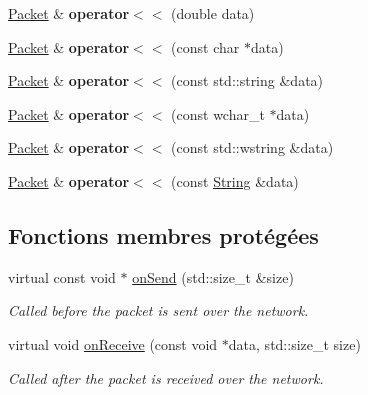 \begin{DoxyCompactItemize}
\hyperlink{classsf_1_1Packet}{Packet} \& {\bfseries operator$<$$<$} (double data)
\item 
\mbox{\label{classsf_1_1Packet_a67c9985f7b3d6e90886e56e309280a9d}} 
\hyperlink{classsf_1_1Packet}{Packet} \& {\bfseries operator$<$$<$} (const char $\ast$data)
\item 
\mbox{\label{classsf_1_1Packet_a59a21671caaa69da5d47c54b50e1eb54}} 
\hyperlink{classsf_1_1Packet}{Packet} \& {\bfseries operator$<$$<$} (const std\+::string \&data)
\item 
\mbox{\label{classsf_1_1Packet_a6f7c6a9ce795fac342ea937896d98016}} 
\hyperlink{classsf_1_1Packet}{Packet} \& {\bfseries operator$<$$<$} (const wchar\+\_\+t $\ast$data)
\item 
\mbox{\label{classsf_1_1Packet_a9f3401d038470f629d0c2c6be928a14b}} 
\hyperlink{classsf_1_1Packet}{Packet} \& {\bfseries operator$<$$<$} (const std\+::wstring \&data)
\item 
\mbox{\label{classsf_1_1Packet_abc17272df082a36b202e10045bd9e220}} 
\hyperlink{classsf_1_1Packet}{Packet} \& {\bfseries operator$<$$<$} (const \hyperlink{classsf_1_1String}{String} \&data)
\end{DoxyCompactItemize}
\subsection*{Fonctions membres protégées}
\begin{DoxyCompactItemize}
\item 
virtual const void $\ast$ \hyperlink{classsf_1_1Packet_a052e955906c9bfd671622cb625380edc}{on\+Send} (std\+::size\+\_\+t \&size)
\begin{DoxyCompactList}\small\item\em Called before the packet is sent over the network. \end{DoxyCompactList}\item 
virtual void \hyperlink{classsf_1_1Packet_ab71a31ef0f1d5d856de6f9fc75434128}{on\+Receive} (const void $\ast$data, std\+::size\+\_\+t size)
\begin{DoxyCompactList}\small\item\em Called after the packet is received over the network. \end{DoxyCompactList}\end{DoxyCompactItemize}
